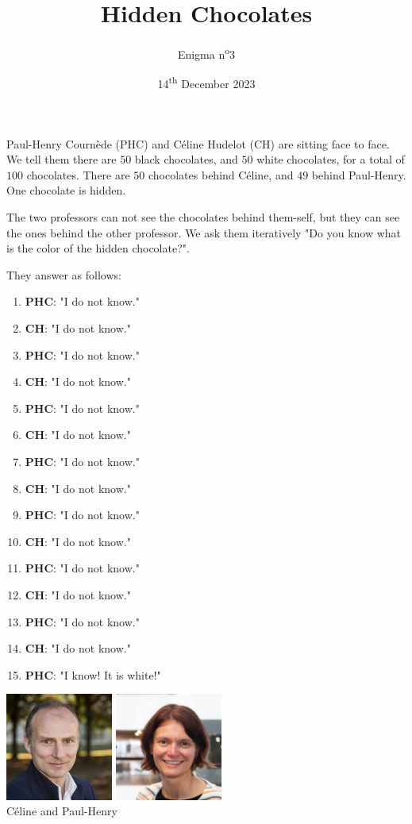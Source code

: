 \documentclass[a4paper, top=10mm]{article}
\title{\textbf{\huge{Hidden Chocolates}}}
\author{Enigma n\textsuperscript{o}3}
\date{14\textsuperscript{th} December 2023}
\begin{document}
	\maketitle
	
	Paul-Henry Cournède (PHC) and Céline Hudelot (CH) are sitting face to face.
	We tell them there are $50$ black chocolates, and $50$ white chocolates, for a total of $100$ chocolates.
	There are $50$ chocolates behind Céline, and $49$ behind Paul-Henry.
	One chocolate is hidden.
	
	The two professors can not see the chocolates behind them-self, but they can see the ones behind the other professor.
	We ask them iteratively "Do you know what is the color of the hidden chocolate?".
	
	They answer as follows:
	
	\begin{enumerate}
		\item \textbf{PHC}: "I do not know."
		\item \textbf{CH}: "I do not know."
		\item \textbf{PHC}: "I do not know."
		\item \textbf{CH}: "I do not know."
		\item \textbf{PHC}: "I do not know."
		\item \textbf{CH}: "I do not know."
		\item \textbf{PHC}: "I do not know."
		\item \textbf{CH}: "I do not know."
		\item \textbf{PHC}: "I do not know."
		\item \textbf{CH}: "I do not know."
		\item \textbf{PHC}: "I do not know."
		\item \textbf{CH}: "I do not know."
		\item \textbf{PHC}: "I do not know."
		\item \textbf{CH}: "I do not know."
		\item \textbf{PHC}: "I know! It is white!"
	\end{enumerate}
	
	\begin{center}
		\includegraphics[height=100pt]{03PHC.jpg}
		\includegraphics[height=100pt]{03CH.png}\\
		Céline and Paul-Henry
	\end{center}
	
\end{document}

